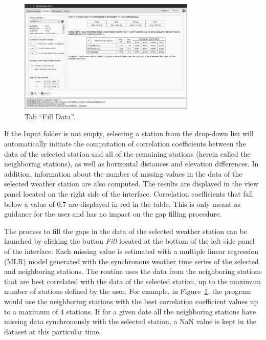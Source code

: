 \documentclass[12pt, letterpaper, fleqn]{report}
\begin{document}
\begin{figure}[h!]
\centering
\includegraphics[width=0.75\textwidth]{WHAT_Screenshot001}
\caption[Tab ``Fill Data''.]{Tab ``Fill Data''.}
\label{fig:tab_fillData}
\end{figure}

If the Input folder is not empty, selecting a station from the drop-down list will automatically initiate the computation of correlation coefficients between the data of the selected station and all of the remaining stations (herein called the neighboring stations), as well as horizontal distances and elevation differences. In addition, information about the number of missing values in the data of the selected weather station are also computed. The results are displayed in the view panel located on the right side of the interface. Correlation coefficients that fall below a value of 0.7 are displayed in red in the table. This is only meant as guidance for the user and has no impact on the gap filling procedure.

The process to fill the gaps in the data of the selected weather station can be launched by clicking the button \emph{Fill} located at the bottom of the left side panel of the interface. Each missing value is estimated with a multiple linear regression (MLR) model generated with the synchronous weather time series of the selected and neighboring stations. The routine uses the data from the neighboring stations that are best correlated with the data of the selected station, up to the maximum number of stations defined by the user. For example, in Figure~\ref{fig:tab_fillData}, the program would use the neighboring stations with the best correlation coefficient values up to a maximum of 4 stations. If for a given date all the neighboring stations have missing data synchronously with the selected station, a NaN value is kept in the dataset at this particular time.  
\end{document}
